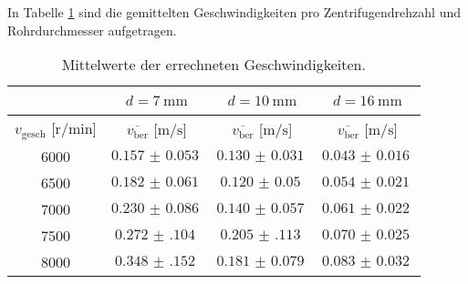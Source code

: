 In Tabelle \ref{tab:7} sind die gemittelten Geschwindigkeiten pro Zentrifugendrehzahl und Rohrdurchmesser aufgetragen.

 \begin{table}
     \centering
     \caption{Mittelwerte der errechneten Geschwindigkeiten.}
     \label{tab:7}
     \begin{tabular}{c || c | c | c}
         \multicolumn{1}{c}{~} & \multicolumn{1}{c}{$d = \SI{7}{\milli\meter}$} & \multicolumn{1}{c}{$d = \SI{10}{\milli\meter}$} & \multicolumn{1}{c}{$d = \SI{16}{\milli\meter}$}\\
         \toprule
         $v_{\text{gesch}}$ [$\si{{\text{r}}\per\minute}$]  & $\overline{v_{\text{ber}}}$ [$\si{\meter\per\second}$] &  $\overline{v_{\text{ber}}}$ [$\si{\meter\per\second}$] & $\overline{v_{\text{ber}}}$ [$\si{\meter\per\second}$] \\
         \midrule
         6000    &  $\SI{0.157(53)}{}$    & $\SI{0.130(31)}{}$   & $\SI{0.043(16)}{}$   \\ 
         6500    &  $\SI{0.182(61)}{}$    & $\SI{0.120(50)}{}$   & $\SI{0.054(21)}{}$   \\ 
         7000    &  $\SI{0.230(86)}{}$    & $\SI{0.140(57)}{}$   & $\SI{0.061(22)}{}$   \\ 
         7500    &  $\SI{0.272(104)}{}$   & $\SI{0.205(113)}{}$  & $\SI{0.070(25)}{}$  \\ 
         8000    &  $\SI{0.348(152)}{}$   & $\SI{0.181(79)}{}$   & $\SI{0.083(32)}{}$   \\  
         \bottomrule
     \end{tabular}
 \end{table}

